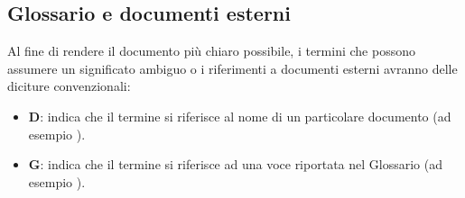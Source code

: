 \subsection{Glossario e documenti esterni}
Al fine di rendere il documento più chiaro possibile, i termini che possono assumere un significato ambiguo o i riferimenti a documenti esterni
avranno delle diciture convenzionali:

\begin{itemize}
    \item \textbf{D}: indica che il termine si riferisce al nome di un particolare documento (ad esempio \PdPd).
    \item \textbf{G}: indica che il termine si riferisce ad una voce riportata nel Glossario (ad esempio ).
\end{itemize}
